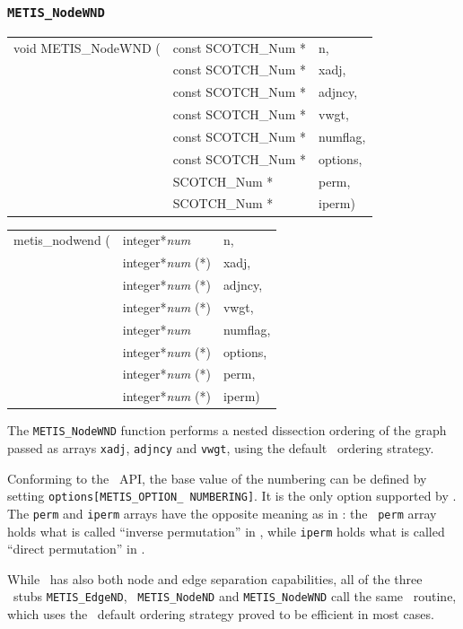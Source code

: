 \subsubsection{{\tt METIS\_NodeWND}}

\begin{itemize}
\progsyn

{\tt\begin{tabular}{l@{}ll}
void METIS\_NodeWND ( & const SCOTCH\_Num * & n,       \\
                      & const SCOTCH\_Num * & xadj,    \\
                      & const SCOTCH\_Num * & adjncy,  \\
                      & const SCOTCH\_Num * & vwgt,    \\
                      & const SCOTCH\_Num * & numflag, \\
                      & const SCOTCH\_Num * & options, \\
                      & SCOTCH\_Num *       & perm,    \\
                      & SCOTCH\_Num *       & iperm)
\end{tabular}}

{\tt\begin{tabular}{l@{}ll}
metis\_nodwend ( & integer*{\it num}     & n,       \\
                 & integer*{\it num} (*) & xadj,    \\
                 & integer*{\it num} (*) & adjncy,  \\
                 & integer*{\it num} (*) & vwgt,    \\
                 & integer*{\it num}     & numflag, \\
                 & integer*{\it num} (*) & options, \\
                 & integer*{\it num} (*) & perm,    \\
                 & integer*{\it num} (*) & iperm)
\end{tabular}}

\progdes

The {\tt METIS\_NodeWND} function performs a nested dissection
ordering of the graph passed as arrays {\tt xadj}, {\tt adjncy}
and {\tt vwgt}, using the default \scotch\ ordering strategy.

Conforming to the \metis\ API, the base value of the numbering
can be defined by setting \texttt{options[METIS\_\lbt OPTION\_\lbt
NUMBERING]}. It is the only option supported by \scotch.
The {\tt perm} and {\tt iperm} arrays have the opposite meaning as in
\scotch: the \metis\ {\tt perm} array holds what is called ``inverse
permutation'' in \scotch, while {\tt iperm} holds what is called
``direct permutation'' in \scotch.

While \scotch\ has also both node and edge separation capabilities,
all of the three \metis\ stubs {\tt METIS\_\lbo EdgeND}, {\tt
METIS\_\lbo NodeND} and {\tt METIS\_\lbo NodeWND} call the same
\scotch\ routine, which uses the \scotch\ default ordering strategy
proved to be efficient in most cases.
\end{itemize}

